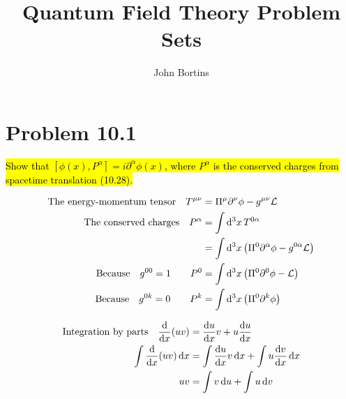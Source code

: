 \documentclass{article}
\title{Quantum Field Theory Problem Sets}
\author{John Bortins}
\begin{document}
\maketitle{}

\section*{Problem 10.1}
\begin{quoting}
  \hl{Show that $[\phi(x),P^\alpha]=i\partial^\alpha \phi(x)$, where $P^\alpha$ is the conserved charges from spacetime translation (10.28).}
\end{quoting}

\begin{align*}
  \qq*{The energy-momentum tensor}T^{\mu\nu} & =\Pi^\mu\partial^\nu \phi-g^{\mu\nu}\mathcal{L}                       \\
  \qq*{The conserved charges}P^\alpha        & =\int\dd[3]{x}T^{0\alpha}                                             \\
                                             & =\int\dd[3]{x}\pqty{\Pi^0\partial^\alpha \phi-g^{0\alpha}\mathcal{L}} \\
  \qq*{Because}g^{00}=1\qquad P^0            & =\int\dd[3]{x}\pqty{\Pi^0\partial^0 \phi-\mathcal{L}}                 \\
  \qq*{Because}g^{0k}=0\qquad P^k            & =\int\dd[3]{x}\pqty{\Pi^0\partial^k \phi}                             \\
\end{align*}

\begin{align*}
  \qq*{Integration by parts} \dv{x}(uv) & =\dv{u}{x}v+u\dv{u}{x}                        \\
  \int \dv{x}(uv) \dd{x}                & = \int \dv{u}{x}v\dd{x}+\int u\dv{v}{x}\dd{x} \\    
  uv                                    & =\int v\dd{u}+\int u\dd{v}                    \\           
\end{align*}
\end{document}
